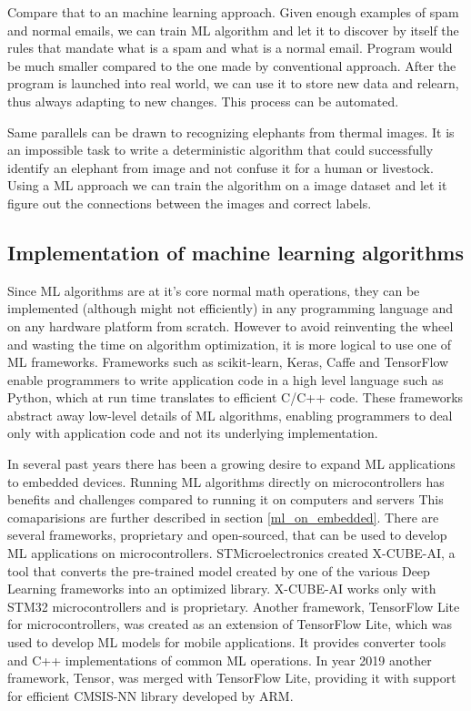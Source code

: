 Compare that to an machine learning approach. 
Given enough examples of spam and normal emails, we can train ML algorithm and let it to discover by itself the rules that mandate what is a spam and what is a normal email.
Program would be much smaller compared to the one made by conventional approach. 
After the program is launched into real world, we can use it to store new data and relearn, thus always adapting to new changes.
This process can be automated.

Same parallels can be drawn to recognizing elephants from thermal images.
It is an impossible task to write a deterministic algorithm that could successfully identify an elephant from image and not confuse it for a human or livestock. 
Using a ML approach we can train the algorithm on a image dataset and let it figure out the connections between the images and correct labels. 


\subsection{ Implementation of machine learning algorithms}

Since ML algorithms are at it's core normal math operations, they can be implemented (although might not efficiently) in any programming language and on any hardware platform from scratch.
However to avoid reinventing the wheel and wasting the time on algorithm optimization, it is more logical to use one of ML frameworks.
Frameworks such as scikit-learn, Keras, Caffe and TensorFlow enable programmers to write application code in a high level language such as Python, which at run time translates to efficient C/C++ code. 
These frameworks abstract away low-level details of ML algorithms, enabling programmers to deal only with application code and not its underlying implementation.

In several past years there has been a growing desire to expand ML applications to embedded devices.
Running ML algorithms directly on microcontrollers has benefits and challenges compared to running it on computers and servers
This comaparisions are further described in section \ref{ml_on_embedded}.
There are several frameworks, proprietary and open-sourced, that can be used to develop ML applications on microcontrollers.
STMicroelectronics created X-CUBE-AI, a tool that converts the pre-trained model created by one of the various Deep Learning frameworks into an optimized library. 
X-CUBE-AI works only with STM32 microcontrollers and is proprietary.
Another framework, TensorFlow Lite for microcontrollers, was created as an extension of TensorFlow Lite, which was used to develop ML models for mobile applications.
It provides converter tools and C++ implementations of common ML operations.
In year 2019 another framework, \si{\micro}Tensor, was merged with TensorFlow Lite, providing it with support for efficient CMSIS-NN library developed by ARM.

